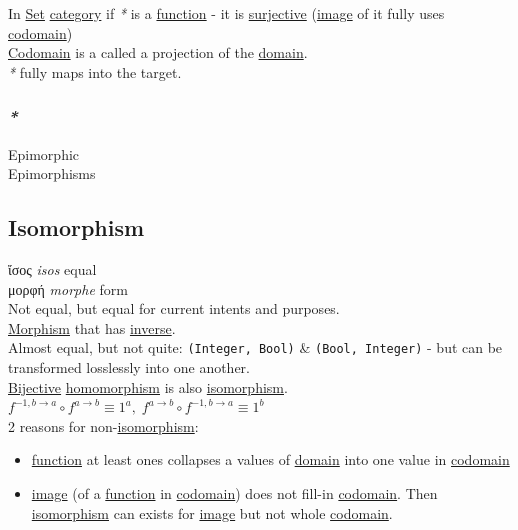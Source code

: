 \documentclass[a4paper,14pt,oneside]{book}
\begin{document}
{In \hyperref[org0726f94]{Set} \hyperref[orgf2b19ad]{category} if \emph{*} is a \hyperref[org6a60524]{function} - it is \hyperref[org6620f6e]{surjective} (\hyperref[org270220b]{image} of it fully uses \hyperref[org746d351]{codomain})\\
\hyperref[org746d351]{Codomain} is a called a projection of the \hyperref[org17b9ae1]{domain}.\\

\emph{*} fully maps into the target.\\

\subsubsection{\emph{*}}
\label{sec:orgca8fe37}

\label{orgf93df9b}Epimorphic\\
\label{org0a1a765}Epimorphisms\\

\subsection{\label{orgf1f1620}Isomorphism}
\label{sec:orge71e5fd}
ἴσος \emph{isos} equal\\
μορφή \emph{morphe} form\\

Not equal, but equal for current intents and purposes.\\
\hyperref[orgc09f1a4]{Morphism} that has \hyperref[org5ab3e3c]{inverse}.\\
Almost equal, but not quite: \texttt{(Integer, Bool)} \& \texttt{(Bool, Integer)} - but can be transformed losslessly into one another.\\

\hyperref[org223f583]{Bijective} \hyperref[org203620e]{homomorphism} is also \hyperref[orgf1f1620]{isomorphism}.\\

\(f^{-1, b \to a} \circ f^{a \to b} \equiv 1^a, \; f^{a \to b} \circ f^{-1, b \to a} \equiv 1^b\)\\

2 reasons for non-\hyperref[orgf1f1620]{isomorphism}:\\
\begin{itemize}
\item \hyperref[org6a60524]{function} at least ones collapses a values of \hyperref[org17b9ae1]{domain} into one value in \hyperref[org746d351]{codomain}\\
\item \hyperref[org270220b]{image} (of a \hyperref[org6a60524]{function} in \hyperref[org746d351]{codomain}) does not fill-in \hyperref[org746d351]{codomain}. Then \hyperref[orgf1f1620]{isomorphism} can exists for \hyperref[org270220b]{image} but not whole \hyperref[org746d351]{codomain}.\\
\end{itemize}

}
\end{document}
